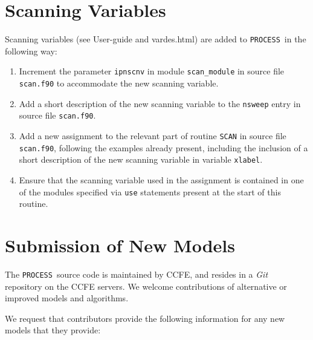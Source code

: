 \documentclass[11pt,a4paper]{report}
\newcommand{\process}{\mbox{\texttt{PROCESS}}}
\begin{document}
\section{Scanning Variables}

Scanning variables (see User-guide and vardes.html) are added to \process\ in
the following way:

\begin{enumerate}

\item Increment the parameter \texttt{ipnscnv} in module \texttt{scan\_module}
  in source file \texttt{scan.f90} to accommodate the new scanning variable.

\item Add a short description of the new scanning variable to the
  \texttt{nsweep} entry in source file \texttt{scan.f90}.

\item Add a new assignment to the relevant part of routine \texttt{SCAN} in
  source file \texttt{scan.f90}, following the examples already present,
  including the inclusion of a short description of the new scanning variable
  in variable \texttt{xlabel}.

\item Ensure that the scanning variable used in the assignment is contained in
  one of the modules specified via \texttt{use} statements present at the
  start of this routine.

\end{enumerate}

\section{Submission of New Models}

The \process\ source code is maintained by CCFE, and resides in a
\textit{Git}~\cite{git} repository on the CCFE servers. We welcome
contributions of alternative or improved models and algorithms.

We request that contributors provide the following information for any new models that they provide:
\end{document}
